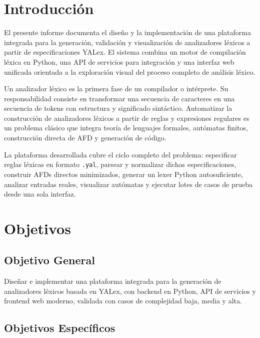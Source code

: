 \documentclass[12pt,a4paper]{article}
\begin{document}
\newpage
\tableofcontents
\newpage

\section{Introducción}

El presente informe documenta el diseño y la implementación de una plataforma integrada para la generación, validación y visualización de analizadores léxicos a partir de especificaciones YALex. El sistema combina un motor de compilación léxica en Python, una API de servicios para integración y una interfaz web unificada orientada a la exploración visual del proceso completo de análisis léxico.

Un analizador léxico es la primera fase de un compilador o intérprete. Su responsabilidad consiste en transformar una secuencia de caracteres en una secuencia de tokens con estructura y significado sintáctico. Automatizar la construcción de analizadores léxicos a partir de reglas y expresiones regulares es un problema clásico que integra teoría de lenguajes formales, autómatas finitos, construcción directa de AFD y generación de código.

La plataforma desarrollada cubre el ciclo completo del problema: especificar reglas léxicas en formato \texttt{.yal}, parsear y normalizar dichas especificaciones, construir AFDs directos minimizados, generar un lexer Python autosuficiente, analizar entradas reales, visualizar autómatas y ejecutar lotes de casos de prueba desde una sola interfaz.

\section{Objetivos}

\subsection{Objetivo General}

Diseñar e implementar una plataforma integrada para la generación de analizadores léxicos basada en YALex, con backend en Python, API de servicios y frontend web moderno, validada con casos de complejidad baja, media y alta.

\subsection{Objetivos Específicos}
\end{document}
